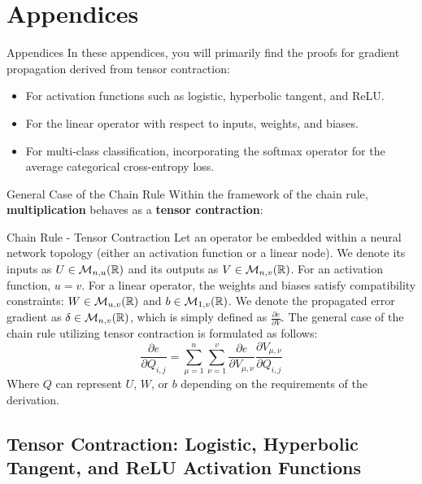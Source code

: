 \section[Appendices]{Appendices}

\begin{frame}{Appendices}
	In these appendices, you will primarily find the proofs for gradient propagation derived from tensor contraction:
	\begin{itemize}
		\item For activation functions such as logistic, hyperbolic tangent, and ReLU.
		\item For the linear operator with respect to inputs, weights, and biases.
		\item For multi-class classification, incorporating the softmax operator for the average categorical cross-entropy loss.
	\end{itemize}
\end{frame}

\begin{frame}{General Case of the Chain Rule}
	Within the framework of the chain rule, \textbf{multiplication} behaves as a \textbf{tensor contraction}:
	
	\begin{block}{Chain Rule - Tensor Contraction}
		Let an operator be embedded within a neural network topology (either an activation function or a linear node). We denote its inputs as $U \in \mathcal{M}_{n, u}(\mathbb{R})$ and its outputs as $V \in \mathcal{M}_{n, v}(\mathbb{R})$. For an activation function, $u = v$. For a linear operator, the weights and biases satisfy compatibility constraints: $W \in \mathcal{M}_{u, v}(\mathbb{R})$ and $b \in \mathcal{M}_{1, v}(\mathbb{R})$. We denote the propagated error gradient as $\delta \in \mathcal{M}_{n, v}(\mathbb{R})$, which is simply defined as $\frac{\partial{e}}{\partial{V}}$.
		The general case of the chain rule utilizing tensor contraction is formulated as follows:
		\begin{equation*}
			\frac{\partial{e}}{\partial{Q_{i,j}}} = \sum_{\mu=1}^n \sum_{\nu=1}^v \frac{\partial{e}}{\partial{V_{\mu,\nu}}} \frac{\partial{V_{\mu,\nu}}}{\partial{Q_{i,j}}}
		\end{equation*}
		Where $Q$ can represent $U$, $W$, or $b$ depending on the requirements of the derivation.
	\end{block}
\end{frame}

\subsection{Tensor Contraction: Logistic, Hyperbolic Tangent, and ReLU Activation Functions}

